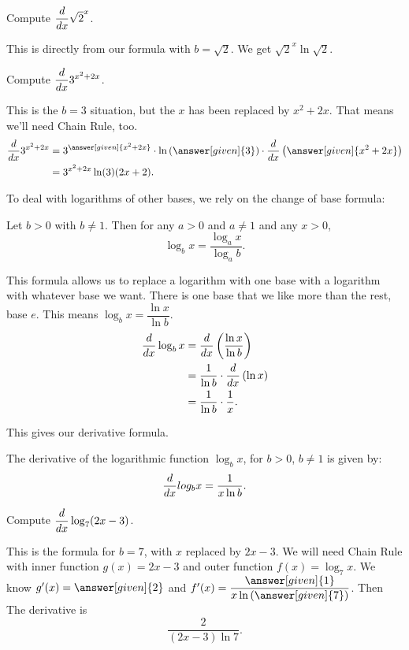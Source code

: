 \documentclass{ximera}
\begin{document}
\begin{example}
	Compute $\displaystyle \frac{d}{\mathop{}\!d x} \sqrt{2}^x$.
	\begin{explanation}
		This is directly from our formula with $b = \sqrt{2}$.  We get  $\displaystyle \sqrt{2}^x \ln\sqrt 2$.
	\end{explanation}
\end{example}

\begin{example}
	Compute $\displaystyle \frac{d}{\mathop{}\!d x} 3^{x^2+2x}$.
	\begin{explanation}
		This is the $b=3$ situation, but the $x$ has been replaced by $x^2 + 2x$.  That means we'll need Chain Rule, too.
		\begin{align*}
			\ddx 3^{x^2 + 2x} &= 3^{\answer[given]{x^2+2x}} \cdot \ln \left( \answer[given]{3} \right) \cdot \ddx \left(  \answer[given]{x^2+2x}\right)\\
				&= 3^{x^2+2x} \ln(3) (2x+2).
		\end{align*}
	\end{explanation}
\end{example}

To deal with logarithms of other bases, we rely on the change of base formula:
\begin{theorem}
	Let $b > 0$ with $b \neq 1$.  Then for any $a > 0$ and $a \neq 1$ and any $x > 0$,
	\[ \log_b x = \dfrac{\log_a x  }{ \log_a b }. \]
\end{theorem}

This formula allows us to replace a logarithm with one base with a logarithm with whatever base we want.  There is one base that we like more than the
rest, base $e$.  This means $\displaystyle \log_b x = \dfrac{ \ln x}{ \ln b}$. 
\begin{align*}
	\frac{d}{\mathop{}\!d x} \log_b x &= \frac{d}{\mathop{}\!d x} \left( \dfrac{ \ln x }{\ln b} \right)\\
		&= \dfrac{1}{\ln b} \cdot \frac{d}{\mathop{}\!d x}\left( \ln x \right) \\
		&= \dfrac{1}{\ln b} \cdot \dfrac{1}{x}.
\end{align*}

This gives our derivative formula.
\begin{theorem}
	The derivative of the logarithmic function $\log_b x$, for $b > 0$, $b \neq 1$ is given by:
	\[ \frac{d}{\mathop{}\!d x} log_b x = \dfrac{1}{x \ln b}. \]
\end{theorem}

\begin{example}
	Compute $\displaystyle \frac{d}{\mathop{}\!d x} \log_7(2x-3)$.
	\begin{explanation}
		This is the formula for $b=7$, with $x$ replaced by $2x-3$.  We will need Chain Rule with inner function $g(x) = 2x-3$ and outer function $f(x) = \log_7 x$.
		We know $g'(x) = \answer[given]{2}$ and $f'(x) = \dfrac{\answer[given]{1}}{x \ln\left( \answer[given]{7} \right)}$.  Then
		The derivative is \[ \dfrac{2}{(2x-3) \ln 7}. \]
	\end{explanation}
\end{example}
\end{document}
